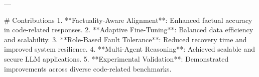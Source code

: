 ---

# Contributions  
1. **Factuality-Aware Alignment**: Enhanced factual accuracy in code-related responses.  
2. **Adaptive Fine-Tuning**: Balanced data efficiency and scalability.  
3. **Role-Based Fault Tolerance**: Reduced recovery time and improved system resilience.  
4. **Multi-Agent Reasoning**: Achieved scalable and secure LLM applications.  
5. **Experimental Validation**: Demonstrated improvements across diverse code-related benchmarks.  